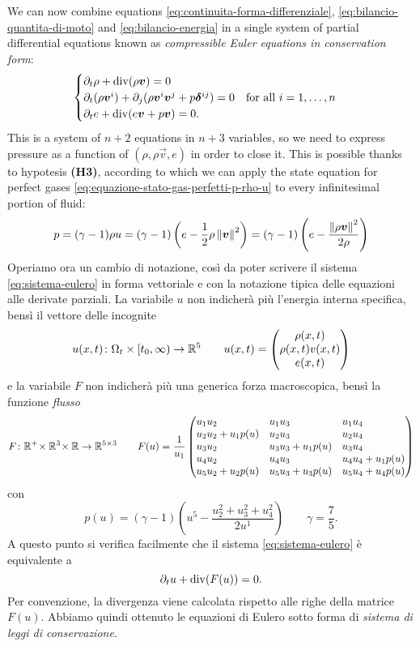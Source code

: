 We can now combine equations \eqref{eq:continuita-forma-differenziale},
\eqref{eq:bilancio-quantita-di-moto} and \eqref{eq:bilancio-energia}
in a single system of partial differential equations known as
\emph{compressible Euler equations in conservation form}:
\begin{equation} \label{eq:sistema-eulero}
\begin{cases}
\partial_t \rho + \operatorname{div}(\rho \bm{v}) = 0 \\
\partial_t (\rho \bm{v}^i)
	+ \partial_j (\rho \bm{v}^i \bm{v}^j + p\bm{\delta}^{ij})
	= 0 \quad \text{for all $i = 1,\dots,n$} \\
\partial_t e + \operatorname{div}(e \bm{v} + p \bm{v}) = 0.
\end{cases}
\end{equation}
This is a system of $n+2$ equations in $n+3$ variables, so we need
to express pressure as a function of $(\rho,\rho\vec{v},e)$ in order to close it.
This is possible thanks to hypotesis \textbf{(H3)}, according to which
we can apply the state equation for perfect gases
\eqref{eq:equazione-stato-gas-perfetti-p-rho-u} to every infinitesimal
portion of fluid:
\[
p
= (\gamma-1) \rho u
= (\gamma-1) \left( e - \frac{1}{2} \rho \left\lVert\bm{v}\right\rVert^2 \right)
= (\gamma-1) \left( e - \frac{\left\lVert\rho \bm{v}\right\rVert^2}{2\rho} \right)
\]
Operiamo ora un cambio di notazione, così da poter
scrivere il sistema \eqref{eq:sistema-eulero} in forma vettoriale e
con la notazione tipica delle equazioni alle derivate parziali.
La variabile $u$ non indicherà più l'energia interna specifica,
bensì il vettore delle incognite
\[
u(x,t) \colon \Omega_t \times [t_0,\infty) \to \mathbb{R}^5
\qquad u(x,t) = \begin{pmatrix} \rho(x,t) \\ \rho(x,t) v(x,t) \\ e(x,t) \end{pmatrix}
\]
e la variabile $F$ non indicherà più una generica forza macroscopica,
bensì la funzione \emph{flusso}
\[
F \colon \R^+ \! \times \R^3 \! \times \R \to \R^{5 \times 3}
\qquad
F(u) =
\frac{1}{u_1}
\begin{pmatrix*}[l]
u_1 u_2            & u_1 u_3            & u_1 u_4            \\
u_2 u_2 + u_1 p(u) & u_2 u_3            & u_2 u_4            \\
u_3 u_2            & u_3 u_3 + u_1 p(u) & u_3 u_4            \\
u_4 u_2            & u_4 u_3            & u_4 u_4 + u_1 p(u) \\
u_5 u_2 + u_2 p(u) & u_5 u_3 + u_3 p(u) & u_5 u_4 + u_4 p(u)
\end{pmatrix*}
\]
con
\begin{equation*}
p(u) = (\gamma-1) \left( u^5 - \frac{u_2^2+u_3^2+u_4^2}{2 u^1} \right)
\qquad \gamma = \frac{7}{5}.
\end{equation*}
A questo punto si verifica facilmente che il sistema \eqref{eq:sistema-eulero}
è equivalente a
\[
\partial_t u + \operatorname{div}(F(u)) = 0.
\]
Per convenzione, la divergenza viene calcolata rispetto alle righe
della matrice $F(u)$.
Abbiamo quindi ottenuto le equazioni di Eulero sotto forma di
\emph{sistema di leggi di conservazione}.

